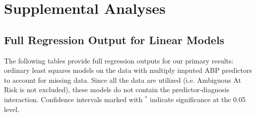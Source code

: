 \documentclass[10pt]{article}\usepackage[]{graphicx}\usepackage[]{color}
\begin{document}
\clearpage
\section{Supplemental Analyses}

\subsection{Full Regression Output for Linear Models}
\label{sec:fullOutput}

The following tables provide full regression outputs for our primary results: ordinary least squares models on the data with multiply imputed ABP predictors to account for missing data. Since all the data are utilized (i.e. Ambiguous At Risk is not excluded), these models do not contain the predictor-diagnosis interaction. Confidence intervals marked with $^{*}$ indicate significance at the 0.05 level.
\end{document}
